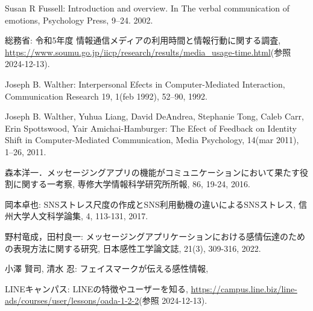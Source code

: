 \documentclass[11pt,a4paper]{ltjsreport}
\makeatletter
\renewcommand{\chapter}{%
    \if@openleft\cleardoublepage\else
    \if@openright\cleardoublepage\else\clearpage\fi\fi
    \global\@topnum\z@
    \if@english \@afterindentfalse \else \@afterindenttrue \fi
    \secdef
    {\@omit@numberfalse\@chapter}%
    {\@omit@numbertrue\@schapter}}
\makeatother
\begin{document}
\pagestyle{fancy}
\fancyhead{} %
\renewcommand{\chaptermark}[1]{\lhead{参考文献\ \thechapter\ ~~~#1}{}}
\chead{} %
\rhead{\thepage} %
\lfoot{} %
\cfoot{} %
\renewcommand{\footrulewidth}{0.5pt} %
\titleformat{\chapter}[display]{\huge\bfseries}{参考文献\ \thechapter}{20pt}{}[]

\begin{thebibliography}{99} %
    Susan R Fussell: Introduction and overview. In The verbal communication of emotions, 
    Psychology Press, 9–24. 2002.

    総務省: 令和5年度 情報通信メディアの利用時間と情報行動に関する調査,
    \url{https://www.soumu.go.jp/iicp/research/results/media_usage-time.html}(参照 2024-12-13).

    Joseph B. Walther: Interpersonal Efects in Computer-Mediated Interaction, 
    Communication Research 19, 1(feb 1992), 52–90, 1992.

    Joseph B. Walther, Yuhua Liang, David DeAndrea, Stephanie Tong, Caleb Carr, 
    Erin Spottswood, Yair Amichai-Hamburger:
    The Efect of Feedback on Identity Shift in Computer-Mediated Communication, 
    Media Psychology, 14(mar 2011), 1–26, 2011.

    森本洋一．メッセージングアプリの機能がコミュニケーションにおいて果たす役割に関する一考察,
    専修大学情報科学研究所所報, 86, 19-24, 2016.

    岡本卓也: SNSストレス尺度の作成とSNS利用動機の違いによるSNSストレス,
    信州大学人文科学論集, 4, 113-131, 2017.

    野村竜成，田村良一: メッセージングアプリケーションにおける感情伝達のための表現方法に関する研究,
    日本感性工学論文誌, 21(3), 309-316, 2022.

    小澤 賢司, 清水 忍: フェイスマークが伝える感性情報,

    LINEキャンパス: LINEの特徴やユーザーを知る,
    \url{https://campus.line.biz/line-ads/courses/user/lessons/oada-1-2-2}(参照 2024-12-13).


\end{thebibliography}
\end{document}

